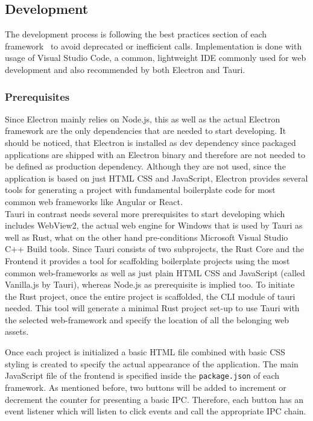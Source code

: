 
\subsection{Development}
\label{subsec:impl:dev}
The development process is following the best practices section of each framework~\cite{ElectronDoc,tauri} to avoid deprecated or inefficient calls.
Implementation is done with usage of Visual Studio Code, a common, lightweight \ac{IDE} commonly used for web development and also recommended by both Electron and Tauri.

\subsubsection{Prerequisites}

Since Electron mainly relies on Node.js, this as well as the actual Electron framework are the only dependencies that are needed to start developing.
It should be noticed, that Electron is installed as dev dependency since packaged applications are shipped with an Electron binary and therefore are not needed to be defined as production dependency.
Although they are not used, since the application is based on just \ac{HTML} \ac{CSS} and JavaScript, Electron provides several tools for generating a project with fundamental boilerplate code for most common web frameworks like Angular or React.\\
Tauri in contrast needs several more prerequisites to start developing which includes WebView2, the actual web engine for Windows that is used by Tauri as well as Rust, what on the other hand pre-conditions Microsoft Visual Studio C++ Build tools.
Since Tauri consists of two subprojects, the Rust Core and the Frontend it provides a tool for scaffolding boilerplate projects using the most common web-frameworks as well as just plain \ac{HTML} \ac{CSS} and JavaScript (called Vanilla.js by Tauri),
whereas Node.js as prerequisite is implied too.
To initiate the Rust project, once the entire project is scaffolded, the CLI module of tauri needed.
This tool will generate a minimal Rust project set-up to use Tauri with the selected web-framework and specify the location of all the belonging web assets.

Once each project is initialized a basic \ac{HTML} file combined with basic \ac{CSS} styling is created to specify the actual appearance of the application.
The main JavaScript file of the frontend is specified inside the \texttt{package.json} of each framework.
As mentioned before, two buttons will be added to increment or decrement the counter for presenting a basic \ac{IPC}.
Therefore, each button has an event listener which will listen to click events and call the appropriate \ac{IPC} chain.

